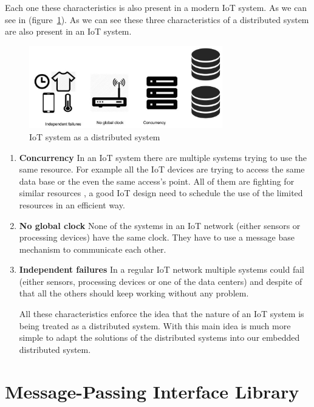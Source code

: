 Each one these characteristics is also present in a modern IoT system. As we can
see in (figure~\ref{fig:3.1}). As we can see these three characteristics of a
distributed system are also present in an IoT system. 

\begin{figure}[H]
\centering
\includegraphics[width=0.75\textwidth]{images/IoT_distributed.jpg}
\caption{IoT system as a distributed system}
\label{fig:3.1}
\end{figure}


\begin{enumerate}
\item \textbf{Concurrency}
In an IoT system there are multiple systems trying to use the same resource.
For example all the IoT devices are trying to access the same data base or the
even the same access's point. All of them are fighting for similar resources , a
good IoT design need to schedule the use of the limited resources in an efficient
way.

\item \textbf{No global clock}
None of the systems in an IoT network (either sensors or processing devices)
have the same clock. They have to use a message base mechanism to communicate
each other. 

\item \textbf{Independent failures}
In a regular IoT network multiple systems could fail (either sensors,
processing devices or one of the data centers) and despite of that all the
others should keep working without any problem. 

All these characteristics enforce the idea that the nature of an IoT system is
being treated as a distributed system. With this main idea is much more simple
to adapt the solutions of the distributed systems into our embedded distributed
system.

\end{enumerate}

\section{Message-Passing Interface Library}
\noindent

